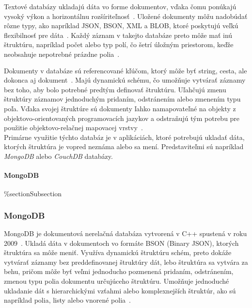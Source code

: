 Textové databázy ukladajú dáta vo forme dokumentov, vďaka čomu ponúkajú vysoký výkon a horizontálnu rozšíriteľnosť~\cite{NoSQLDBvsRealtionDB}. Uložené dokumenty môžu nadobúdať rôzne typy, ako napríklad JSON, BSON, XML a BLOB, ktoré poskytujú veľkú flexibilnosť pre dáta~\cite{MongoDBvsMySQLCompared}. Každý záznam v takejto databáze preto môže mať inú štruktúru, napríklad počet alebo typ polí, čo šetrí úložným priestorom, keďže neobsahuje nepotrebné prázdne polia~\cite{NoSQLDBvsRealtionDB}.

Dokumenty v databáze sú referencované kľúčom, ktorý môže byť string, cesta, ale dokonca aj dokument~\cite{NoSQLDBvsRealtionDB}. Majú dynamickú schému, čo umožňuje vytvárať záznamy bez toho, aby bolo potrebné predtým definovať štruktúru. Uľahčujú zmenu štruktúry záznamov jednoduchým pridaním, odstránením alebo zmenením typu poľa. Vďaka svojej štruktúre sú dokumenty ľahko namapovateľné na objekty z objektovo-orientovaných programovacích jazykov a odstraňujú tým potrebu pre použitie objektovo-relačnej mapovacej vrstvy~\cite{MongoDBvsMySQLCompared}.
\\

Primárne využitie týchto databáz je v aplikáciách, ktoré potrebujú ukladať dáta, ktorých štruktúra je vopred neznáma alebo sa mení. Predstaviteľmi sú napríklad \textit{MongoDB} alebo \textit{CouchDB} databázy.

%
%
{
	\paragraph{MongoDB}
}
{
	\%section{Subsection}
	\subsubsection{MongoDB}
}
\label{subsection:mongodb}
MongoDB je dokumentová nerelačná databáza vytvorená v C++ spustená v roku 2009~\cite{NoSQLDBvsRealtionDB}. Ukladá dáta v dokumentoch vo formáte BSON (Binary JSON), ktorých štruktúra sa môže meniť. Využíva dynamickú štruktúru schém, preto dokáže vytvárať záznamy bez preddefinovanej štruktúry dát, lebo štruktúra sa vytvára za behu, pričom môže byť veľmi jednoducho pozmenená pridaním, odstránením, zmenou typu polia dokumentu určujúceho štruktúru. Umožňuje jednoduché ukladanie dát s hierarchickými vzťahmi alebo komplexnejších štruktúr, ako sú napríklad polia, listy alebo vnorené polia~\cite{MongoDBvsMySQLCompared}.

